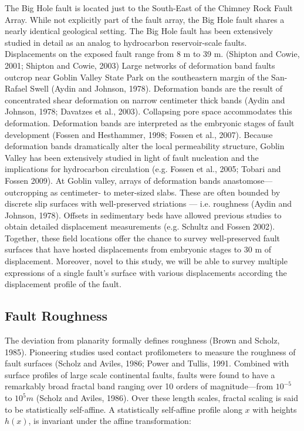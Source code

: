 \documentclass[12pt,a4paper]{article}
\begin{document}
The Big Hole fault is located just to the South-East of the Chimney Rock Fault Array. While not explicitly part of the fault array, the Big Hole fault shares a nearly identical geological setting. The Big Hole fault has been extensively studied in detail as an analog to hydrocarbon reservoir-scale faults. Displacements on the exposed fault range from 8 m to 39 m. (Shipton and Cowie, 2001; Shipton and Cowie, 2003) 
	Large networks of deformation band faults outcrop near Goblin Valley State Park on the southeastern margin of the San-Rafael Swell (Aydin and Johnson, 1978). Deformation bands are the result of concentrated shear deformation on narrow centimeter thick bands (Aydin and Johnson, 1978; Davatzes et al., 2003). Collapsing pore space accommodates this deformation. Deformation bands are interpreted as the embryonic stages of fault development (Fossen and Hesthammer, 1998; Fossen et al., 2007). Because deformation bands dramatically alter the local permeability structure, Goblin Valley has been extensively studied in light of fault nucleation and the implications for hydrocarbon circulation (e.g. Fossen et al., 2005; Tobari and Fossen 2009). At Goblin valley, arrays of deformation bands anastomose—outcropping as centimeter- to meter-sized slabs.  These are often bounded by discrete slip surfaces with well-preserved striations — i.e. roughness (Aydin and Johnson, 1978). Offsets in sedimentary beds have allowed previous studies to obtain detailed displacement measurements (e.g. Schultz and Fossen 2002). 
Together, these field locations offer the chance to survey well-preserved fault surfaces that have hosted displacements from embryonic stages to 30 m of displacement. Moreover, novel to this study, we will be able to survey multiple expressions of a single fault’s surface with various displacements according the displacement profile of the fault. 


\subsection{Fault Roughness}

The deviation from planarity formally defines roughness (Brown and Scholz, 1985). Pioneering studies used contact profilometers to measure the roughness of fault surfaces (Scholz and Aviles, 1986; Power and Tullis, 1991. Combined with surface profiles of large scale continental faults, faults were found to have a remarkably broad fractal band ranging over 10 orders of magnitude—from $10^{-5}$ to $10^5 m$ (Scholz and Aviles, 1986). Over these length scales, fractal scaling is said to be statistically self-affine. 	
A statistically self-affine profile along $x$ with heights $h(x)$, is invariant under the affine transformation:
\end{document}
